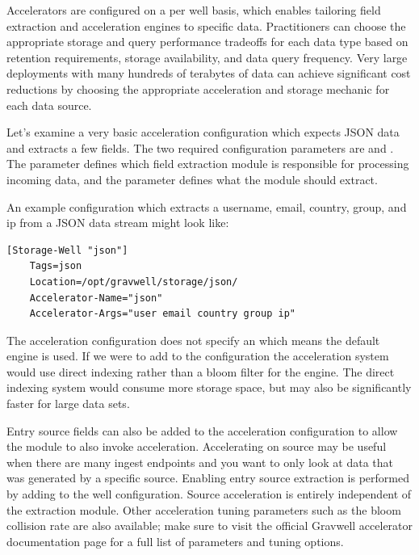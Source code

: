 {Accelerators are configured on a per well basis, which enables
tailoring field extraction and acceleration engines to specific data.
Practitioners can choose the appropriate storage and query performance
tradeoffs for each data type based on retention requirements, storage
availability, and data query frequency. Very large deployments with
many hundreds of terabytes of data can achieve significant cost
reductions by choosing the appropriate acceleration and storage mechanic
for each data source.

Let's examine a very basic acceleration configuration which expects
JSON data and extracts a few fields. The two required configuration
parameters are  and . The
 parameter defines which field extraction module is
responsible for processing incoming data, and the
 parameter defines what the module should extract.

An example configuration which extracts a username, email,
country, group, and ip from a JSON data stream might look
like:

\begin{Verbatim}[breaklines=true]
[Storage-Well "json"]
    Tags=json
    Location=/opt/gravwell/storage/json/
    Accelerator-Name="json"
    Accelerator-Args="user email country group ip"
\end{Verbatim}

The acceleration configuration does not specify an
 which means the default engine 
 is used. If we were to add
 to the configuration the
acceleration system would use direct indexing rather than a bloom filter
for the engine. The direct indexing system would consume more storage
space, but may also be significantly faster for large data sets.

Entry source fields can also be added to the acceleration configuration
to allow the  module to also invoke acceleration. Accelerating
on source may be useful when there are many ingest endpoints and you
want to only look at data that was generated by a specific source.
Enabling entry source extraction is performed by adding
 to the well configuration. Source
acceleration is entirely independent of the extraction module. Other
acceleration tuning parameters such as the bloom collision rate are also
available; make sure to visit the official Gravwell accelerator
documentation page for a full list of parameters and tuning options.

}
